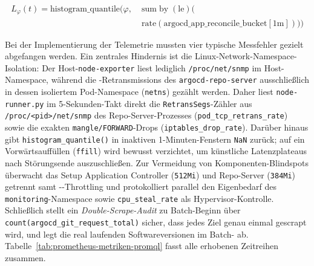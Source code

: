 \begin{equation}
\begin{aligned}
L_{\varphi}(t) = \mathrm{histogram\_quantile}(\varphi,\;&\mathrm{sum\;by\;(\mathrm{le})}( \\
&\mathrm{rate}(\mathrm{argocd\_app\_reconcile\_bucket}[1\mathrm{m}])))
\end{aligned}
\label{eq:promql-histogram-quantile}
\end{equation}

Bei der Implementierung der Telemetrie mussten vier typische Messfehler gezielt abgefangen werden. Ein zentrales Hindernis ist die Linux-Network-Namespace-Isolation: Der Host-\texttt{node-exporter} liest lediglich \texttt{/proc/\allowbreak{}net/\allowbreak{}snmp} im Host-Namespace, während die -Retrans\-missions des \texttt{argocd-\allowbreak{}repo-\allowbreak{}server} ausschließlich in dessen isoliertem Pod-Namespace (\texttt{netns}) gezählt werden. Daher liest \texttt{node-runner.py} im 5-Sekunden-Takt direkt die \texttt{RetransSegs}-Zähler aus \texttt{/proc/\allowbreak{}<pid>/\allowbreak{}net/\allowbreak{}snmp} des Repo-Server-Prozesses (\texttt{pod\_\allowbreak{}tcp\_\allowbreak{}retrans\_\allowbreak{}rate}) sowie die exakten \texttt{mangle/\allowbreak{}FORWARD}-Drops (\texttt{iptables\_\allowbreak{}drop\_\allowbreak{}rate}). Darüber hinaus gibt \texttt{histogram\_\allowbreak{}quantile()} in inaktiven 1-Minuten-Fenstern \texttt{NaN} zurück; auf ein Vorwärtsauffüllen (\texttt{ffill}) wird bewusst verzichtet, um künstliche Latenzplateaus nach Störungsende auszuschließen. Zur Vermeidung von Komponenten-Blindspots überwacht das Setup Application Controller (\texttt{512Mi}) und Repo-Server (\texttt{384Mi}) getrennt samt --Throttling und protokolliert parallel den Eigenbedarf des \texttt{monitoring}-Namespace sowie \texttt{cpu\_\allowbreak{}steal\_\allowbreak{}rate} als Hypervisor-Kontrolle. Schließlich stellt ein \textit{Double-Scrape-Audit} zu Batch-Beginn über \texttt{count(argocd\_\allowbreak{}git\_\allowbreak{}request\_\allowbreak{}total)} sicher, dass jedes Ziel genau einmal gescrapt wird, und legt die real laufenden Softwareversionen im Batch- ab. Tabelle~\ref{tab:prometheus-metriken-promql} fasst alle erhobenen Zeitreihen zusammen.

